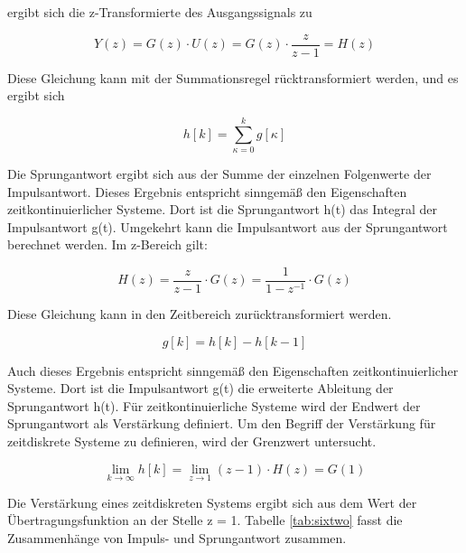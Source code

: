 \noindent ergibt sich die z-Transformierte des Ausgangssignals zu

\begin{equation}\label{eq:sixthirtyfive}
Y\left(z\right)=G\left(z\right)\cdot U\left(z\right)=G\left(z\right)\cdot \frac{z}{z-1} =H\left(z\right)
\end{equation}

\noindent Diese Gleichung kann mit der Summationsregel r\"{u}cktransformiert werden, und es ergibt sich

\begin{equation}\label{eq:sixthirtysix}
h\left[k\right]=\sum _{\kappa =0}^{k}g\left[\kappa \right]
\end{equation}

\noindent Die Sprungantwort ergibt sich aus der Summe der einzelnen Folgenwerte der Impulsantwort. Dieses Ergebnis entspricht sinngem\"{a}{\ss} den Eigenschaften zeitkontinuierlicher Systeme. Dort ist die Sprungantwort h(t) das Integral der Impulsantwort g(t). Umgekehrt kann die Impulsantwort aus der Sprungantwort berechnet werden. Im z-Bereich gilt:

\begin{equation}\label{eq:sixthirtyseven}
H\left(z\right)=\frac{z}{z-1} \cdot G\left(z\right)=\frac{1}{1-z^{-1} } \cdot G\left(z\right)
\end{equation}

\noindent Diese Gleichung kann in den Zeitbereich zur\"{u}cktransformiert werden.

\begin{equation}\label{eq:sixthirtyeight}
g\left[k\right]=h\left[k\right]-h\left[k-1\right]
\end{equation}

\noindent Auch dieses Ergebnis entspricht sinngem\"{a}{\ss} den Eigenschaften zeitkontinuierlicher Systeme. Dort ist die Impulsantwort g(t) die erweiterte Ableitung der Sprungantwort h(t). F\"{u}r zeitkontinuierliche Systeme wird der Endwert der Sprungantwort als Verst\"{a}rkung definiert. Um den Begriff der Verst\"{a}rkung f\"{u}r zeitdiskrete Systeme zu definieren, wird der Grenzwert untersucht.

\begin{equation}\label{eq:sixthirtynine}
{\mathop{\lim }\limits_{k\to \infty }} h\left[k\right]={\mathop{\lim }\limits_{z\to 1}} \left(z-1\right)\cdot H\left(z\right)=G\left(1\right)
\end{equation}

\noindent Die Verst\"{a}rkung eines zeitdiskreten Systems ergibt sich aus dem Wert der \"{U}bertragungsfunktion an der Stelle z = 1. Tabelle \ref{tab:sixtwo} fasst die Zusammenh\"{a}nge von Impuls- und Sprungantwort zusammen.

